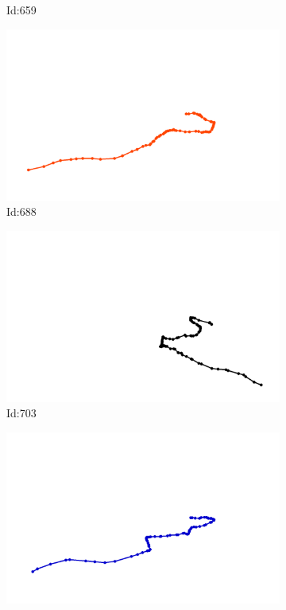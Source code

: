 \documentclass[12pt,twoside]{report}
\begin{document}
\begin{figure}
\begin{subfigure}[b]{0.20\textwidth}
\caption{Id:659}
\end{subfigure}
\begin{subfigure}[b]{0.20\textwidth}
\centering
\includegraphics[width=\textwidth]{../trajectories/688.png}
\caption{Id:688}
\end{subfigure}
\begin{subfigure}[b]{0.20\textwidth}
\centering
\includegraphics[width=\textwidth]{../trajectories/703.png}
\caption{Id:703}
\end{subfigure}
\begin{subfigure}[b]{0.20\textwidth}
\centering
\includegraphics[width=\textwidth]{../trajectories/728.png}

\end{subfigure}
\end{figure}
\end{document}
